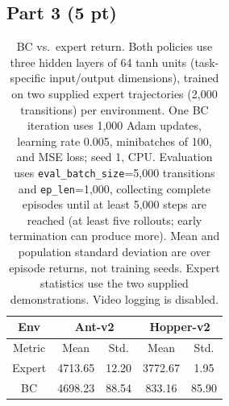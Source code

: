 \subsection{Part 3 (5 pt)}
\begin{table}[htbp]
  \centering
  \caption{BC vs.\ expert return. Both policies use three hidden layers of 64 tanh units (task-specific input/output dimensions), trained on two supplied expert trajectories (2,000 transitions) per environment. One BC iteration uses 1,000 Adam updates, learning rate 0.005, minibatches of 100, and MSE loss; seed 1, CPU. Evaluation uses \texttt{eval\_batch\_size}=5,000 transitions and \texttt{ep\_len}=1,000, collecting complete episodes until at least 5,000 steps are reached (at least five rollouts; early termination can produce more). Mean and population standard deviation are over episode returns, not training seeds. Expert statistics use the two supplied demonstrations. Video logging is disabled.}
  \begin{tabular}{ccccc}
    \toprule
    Env & \multicolumn{2}{c}{Ant-v2} & \multicolumn{2}{c}{Hopper-v2} \\
    \midrule
    Metric & Mean & Std. & Mean & Std. \\
    Expert & 4713.65 & 12.20 & 3772.67 & 1.95 \\
    BC & 4698.23 & 88.54 & 833.16 & 85.90 \\
    \bottomrule
  \end{tabular}
  \label{tab:p3}
\end{table}
